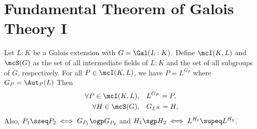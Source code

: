 \documentclass[a4paper]{article}
\begin{document}
\section{Fundamental Theorem of Galois Theory I}
\begin{ttheorem}
  Let \( L:K \) be a Galois extension with \( G = \Gal(L:K) \).
  Define \( \mcI(K,L) \) and \( \mcS(G) \) as the set of all intermediate fields of \( L:K \) and the set of all subgroups of \( G \), respectively.
  For all \( P\in \mcI(K,L) \), we have \( P = L^{G_P} \) where \( G_P = \Aut_P(L)\)
  Then \begin{align*}
    \forall P\in \mcI(K,L), \quad &L^{G_P} = P,\\
    \forall H\in \mcS(G), \quad &G_{L^H} = H,
  \end{align*}
  Also, \( P_1\sseq P_2 \iff G_{P_1}\ogp G_{P_2} \) and \( H_1 \sgp H_2 \iff L^{H_1}\supeq L^{H_2} \). %
\end{ttheorem}
\end{document}
